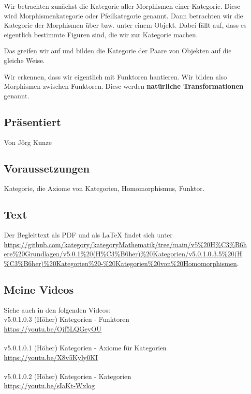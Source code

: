\documentclass[a4paper]{amsart}
\theoremstyle{definition}
\begin{document}
Wir betrachten zunächst die Kategorie aller Morphismen einer Kategorie. Diese wird Morphismenkategorie oder Pfeilkategorie genannt. Dann betrachten wir die Kategorie der Morphismen über bzw. unter einem Objekt. Dabei fällt auf, dass es eigentlich bestimmte Figuren sind, die wir zur Kategorie machen.

Das greifen wir auf und bilden die Kategorie der Paare von Objekten auf die gleiche Weise. 

Wir erkennen, dass wir eigentlich mit Funktoren hantieren. Wir bilden also Morphismen zwischen Funktoren. Diese werden \textbf{natürliche Transformationen} genannt.

\subsection*{Präsentiert}
Von Jörg Kunze

\subsection*{Voraussetzungen}
Kategorie, die Axiome von Kategorien, Homomorphismus, Funktor.

\subsection*{Text}
Der Begleittext als PDF und als LaTeX findet sich unter
\url{https://github.com/kategory/kategoryMathematik/tree/main/v5%20H%C3%B6here%20Grundlagen/v5.0.1%20(H%C3%B6her)%20Kategorien/v5.0.1.0.3.5%20(H%C3%B6her)%20Kategorien%20-%20Kategorien%20von%20Homomorphismen}.

\subsection*{Meine Videos}
Siehe auch in den folgenden Videos:\\
v5.0.1.0.3 (Höher) Kategorien - Funktoren\\
\url{https://youtu.be/Ojf5LQGeyOU}\\
\\
v5.0.1.0.1 (Höher) Kategorien - Axiome für Kategorien\\
 \url{https://youtu.be/X8v5Kyly0KI}\\
 \\
v5.0.1.0.2 (Höher) Kategorien - Kategorien\\
 \url{https://youtu.be/sIaKt-Wxlog}
\end{document}

